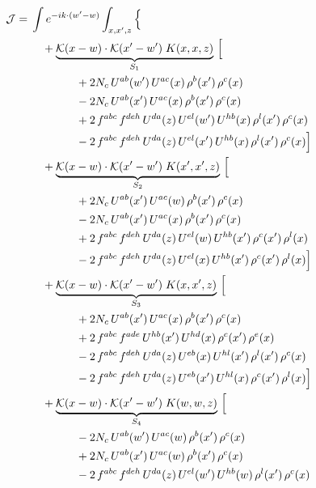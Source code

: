 \documentclass[10pt]{article}
\numberwithin{equation}{section}
\newcommand{\KK}{\mathcal K}
\begin{document}
\begin{align}
\mathcal J={}&\int e^{-ik\cdot(w'-w)}\int_{x,x',z}\Big\{\notag\\
&\quad +\underbrace{\KK(x-w)\cdot\KK(x'-w')\;K(x,x,z)}_{S_{1}}\,\Big[\notag\\
&\qquad\qquad +2 N_c\,U^{ab}(w')\,U^{ac}(x)\,\rho^{b}(x')\,\rho^{c}(x)\notag\\
&\qquad\qquad - 2 N_c\,U^{ab}(x')\,U^{ac}(x)\,\rho^{b}(x')\,\rho^{c}(x)\notag\\
&\qquad\qquad +2\,f^{abc}\,f^{deh}\,U^{da}(z)\,U^{el}(w')\,U^{hb}(x)\,\rho^{l}(x')\,\rho^{c}(x)\notag\\
&\qquad\qquad -2\,f^{abc}\,f^{deh}\,U^{da}(z)\,U^{el}(x')\,U^{hb}(x)\,\rho^{l}(x')\,\rho^{c}(x)\Big]\notag\\
&\quad +\underbrace{\KK(x-w)\cdot\KK(x'-w')\;K(x',x',z)}_{S_{2}}\,\Big[\notag\\
&\qquad\qquad +2 N_c\,U^{ab}(x')\,U^{ac}(w)\,\rho^{b}(x')\,\rho^{c}(x)\notag\\
&\qquad\qquad - 2 N_c\,U^{ab}(x')\,U^{ac}(x)\,\rho^{b}(x')\,\rho^{c}(x)\notag\\
&\qquad\qquad +2\,f^{abc}\,f^{deh}\,U^{da}(z)\,U^{el}(w)\,U^{hb}(x')\,\rho^{c}(x')\,\rho^{l}(x)\notag\\
&\qquad\qquad -2\,f^{abc}\,f^{deh}\,U^{da}(z)\,U^{el}(x)\,U^{hb}(x')\,\rho^{c}(x')\,\rho^{l}(x)\Big]\notag\\
&\quad +\underbrace{\KK(x-w)\cdot\KK(x'-w')\;K(x,x',z)}_{S_{3}}\,\Big[\notag\\
&\qquad\qquad +2 N_c\,U^{ab}(x')\,U^{ac}(x)\,\rho^{b}(x')\,\rho^{c}(x)\notag\\
&\qquad\qquad +2\,f^{abc}\,f^{ade}\,U^{hb}(x')\,U^{hd}(x)\,\rho^{c}(x')\,\rho^{e}(x)\notag\\
&\qquad\qquad -2\,f^{abc}\,f^{deh}\,U^{da}(z)\,U^{eb}(x)\,U^{hl}(x')\,\rho^{l}(x')\,\rho^{c}(x)\notag\\
&\qquad\qquad -2\,f^{abc}\,f^{deh}\,U^{da}(z)\,U^{eb}(x')\,U^{hl}(x)\,\rho^{c}(x')\,\rho^{l}(x)\Big]\notag\\
&\quad +\underbrace{\KK(x-w)\cdot\KK(x'-w')\;K(w,w,z)}_{S_{4}}\,\Big[\notag\\
&\qquad\qquad - 2 N_c\,U^{ab}(w')\,U^{ac}(w)\,\rho^{b}(x')\,\rho^{c}(x)\notag\\
&\qquad\qquad +2 N_c\,U^{ab}(x')\,U^{ac}(w)\,\rho^{b}(x')\,\rho^{c}(x)\notag\\
&\qquad\qquad -2\,f^{abc}\,f^{deh}\,U^{da}(z)\,U^{el}(w')\,U^{hb}(w)\,\rho^{l}(x')\,\rho^{c}(x)\notag\\

\end{align}
\end{document}
